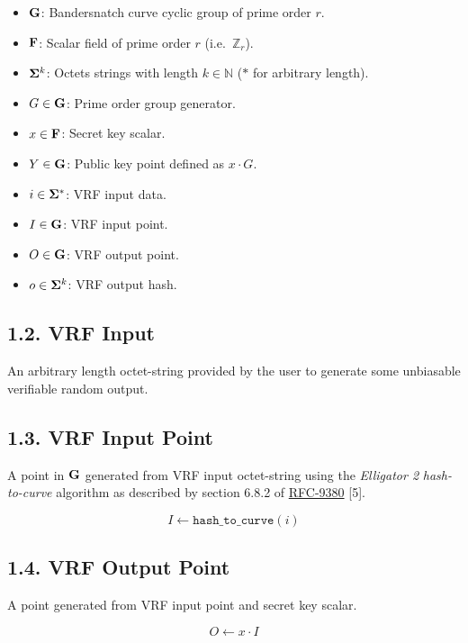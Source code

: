\documentclass[
]{article}
\begin{document}
\begin{itemize}
\item
  \(\bold{G}\): Bandersnatch curve cyclic group of prime order \(r\).
\item
  \(\bold{F}\): Scalar field of prime order \(r\)
  (i.e.~\(\mathbb{Z}_r\)).
\item
  \(\bold{\Sigma}^k\): Octets strings with length \(k \in \mathbb{N}\)
  (\(*\) for arbitrary length).
\item
  \(G \in \bold{G}\): Prime order group generator.
\item
  \(x \in \bold{F}\): Secret key scalar.
\item
  \(Y \in \bold{G}\): Public key point defined as \(x \cdot G\).
\item
  \(i \in \bold{\Sigma}^*\): VRF input data.
\item
  \(I \in \bold{G}\): VRF input point.
\item
  \(O \in \bold{G}\): VRF output point.
\item
  \(o \in \bold{\Sigma}^k\): VRF output hash.
\end{itemize}

\subsection{1.2. VRF Input}\label{vrf-input}

An arbitrary length octet-string provided by the user to generate some
unbiasable verifiable random output.

\subsection{1.3. VRF Input Point}\label{vrf-input-point}

A point in \(\bold{G}\) generated from VRF input octet-string using the
\emph{Elligator 2} \emph{hash-to-curve} algorithm as described by
section 6.8.2 of
\href{https://datatracker.ietf.org/doc/rfc9380}{RFC-9380} {[}5{]}.

\[I \gets \texttt{hash\_to\_curve}(i)\]

\subsection{1.4. VRF Output Point}\label{vrf-output-point}

A point generated from VRF input point and secret key scalar.

\[O \gets x \cdot I\]
\end{document}
